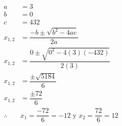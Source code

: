 {\begin{solutionbox}{10.5cm}
\begin{multicols}{2}
\[\begin{array}{rl}
                    a          & =3                                                        \\
                    b          & =0                                                        \\
                    c          & =432                                                      \\
                    x_{1,2}    & = \dfrac{-b\pm\sqrt{b^2-4ac}}{2a}                         \\[2em]
                    x_{1,2}    & = \dfrac{0\pm\sqrt{0^2-4(3)(-432)}}{2(3)}                 \\[2em]
                    x_{1,2}    & = \dfrac{\pm\sqrt{5184}}{6}                               \\[2em]
                    x_{1,2}    & = \dfrac{\pm72}{6}                                        \\[2em]
                    \therefore & x_1 =\dfrac{-72}{6}=-12 \text{ y }  x_2 =\dfrac{72}{6}=12 \\[2em]
                \end{array}
            \]
        \end{multicols}
    \end{solutionbox}
}